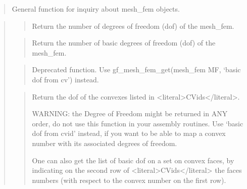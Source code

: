 \documentclass[a4paper,11pt,english]{sphinxmanual}
\begin{document}
\sphinxAtStartPar
{}
\begin{quote}

\sphinxAtStartPar
General function for inquiry about mesh\_fem objects.
\end{quote}

\sphinxAtStartPar
{}
\begin{quote}

\sphinxAtStartPar
{}
\begin{quote}

\sphinxAtStartPar
Return the number of degrees of freedom (dof) of the mesh\_fem.
\end{quote}

\sphinxAtStartPar
{}
\begin{quote}

\sphinxAtStartPar
Return the number of basic degrees of freedom (dof) of the mesh\_fem.
\end{quote}

\sphinxAtStartPar
{}
\begin{quote}

\sphinxAtStartPar
Deprecated function. Use gf\_mesh\_fem\_get(mesh\_fem MF, ‘basic dof from cv’) instead.
\end{quote}

\sphinxAtStartPar
{}
\begin{quote}

\sphinxAtStartPar
Return the dof of the convexes listed in \textless{}literal\textgreater{}CVids\textless{}/literal\textgreater{}.

\sphinxAtStartPar
WARNING: the Degree of Freedom might be returned in ANY order, do
not use this function in your assembly routines. Use ‘basic dof from cvid’
instead, if you want to be able to map a convex number with its
associated degrees of freedom.

\sphinxAtStartPar
One can also get the list of basic dof on a set on convex faces, by
indicating on the second row of \textless{}literal\textgreater{}CVids\textless{}/literal\textgreater{} the faces numbers (with
respect to the convex number on the first row).
\end{quote}


\end{quote}
\end{document}
